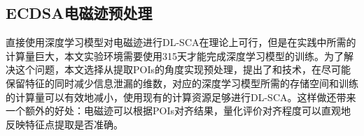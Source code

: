 {{	%
	\subsection{ECDSA电磁迹预处理}\label{subs:selectpoi}

	直接使用深度学习模型对电磁迹进行DL-SCA在理论上可行，但是在实践中所需的计算量巨大，本文实验环境需要使用315天才能完成深度学习模型的训练。为了解决这个问题，本文选择从提取POIs的角度实现预处理，提出了\poifanwei 和\yuchuli 技术，在尽可能保留特征的同时减少信息泄漏的维数，对应的深度学习模型所需的存储空间和训练的计算量可以有效地减小，使用现有的计算资源足够进行DL-SCA。这样做还带来一个额外的好处：电磁迹可以根据POIs对齐结果，量化评价对齐程度可以直观地反映特征点提取是否准确。
{	
	
%	
%	
%	
%	
%	
%		
%	
	
}}}
